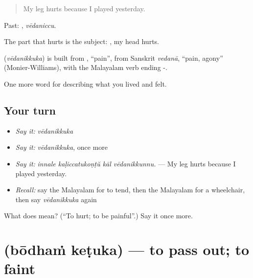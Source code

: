\begin{quote}
My leg hurts because I played yesterday.
\end{quote}

Past: , \emph{vēdaniccu}.

The part that hurts is the subject:  , my head hurts.

\begin{cousinweb}
\textbf{} (\emph{vēdanikkuka}) is built from , \textquotedblleft{}pain\textquotedblright{}, from Sanskrit \emph{vedanā}, \textquotedblleft{}pain, agony\textquotedblright{} (Monier-Williams), with the Malayalam verb ending -.
\end{cousinweb}

\begin{grammarlens}[title={What you've built}]
One more word for describing what you lived and felt.
\end{grammarlens}

\subsection*{Your turn}
\begin{itemize}
\raggedright
  \item \emph{Say it:} \emph{vēdanikkuka}
  \item \emph{Say it:} \emph{vēdanikkuka}, once more
  \item \emph{Say it:} \emph{innale kaḷiccatukoṇṭŭ kāl vēdanikkunnu.} — My leg hurts because I played yesterday.
  \item \emph{Recall:} say the Malayalam for to tend, then the Malayalam for a wheelchair, then say \emph{vēdanikkuka} again
\end{itemize}

\begin{tcolorbox}[breakable,colback=teal!4,colframe=teal!35!black,title={Before you move on}]
What does  mean? (\textquotedblleft{}To hurt; to be painful\textquotedblright{}.) Say it once more.
\end{tcolorbox}
\section[\texorpdfstring{\ml{ബോധം} \ml{കെടുക} (bōdhaṁ keṭuka)}{ബോധം കെടുക (bōdhaṁ keṭuka)}]{  (bōdhaṁ keṭuka) — to pass out; to faint}

\label{lesson:ML-C538-bodham-ketuka}



